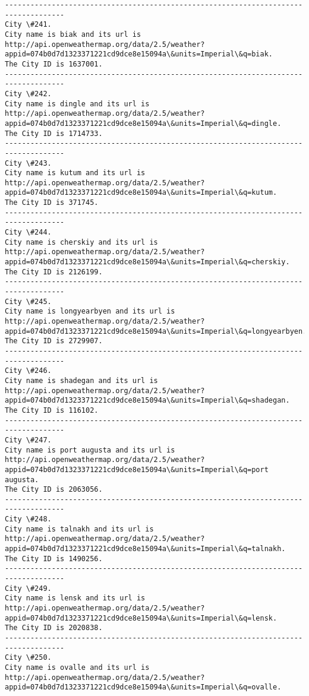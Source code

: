 \documentclass[11pt]{article}
\begin{document}
\begin{Verbatim}[commandchars=\\\{\}]
------------------------------------------------------------------------------------
City \#241.
City name is biak and its url is http://api.openweathermap.org/data/2.5/weather?appid=074b0d7d1323371221cd9dce8e15094a\&units=Imperial\&q=biak.
The City ID is 1637001.
------------------------------------------------------------------------------------
City \#242.
City name is dingle and its url is http://api.openweathermap.org/data/2.5/weather?appid=074b0d7d1323371221cd9dce8e15094a\&units=Imperial\&q=dingle.
The City ID is 1714733.
------------------------------------------------------------------------------------
City \#243.
City name is kutum and its url is http://api.openweathermap.org/data/2.5/weather?appid=074b0d7d1323371221cd9dce8e15094a\&units=Imperial\&q=kutum.
The City ID is 371745.
------------------------------------------------------------------------------------
City \#244.
City name is cherskiy and its url is http://api.openweathermap.org/data/2.5/weather?appid=074b0d7d1323371221cd9dce8e15094a\&units=Imperial\&q=cherskiy.
The City ID is 2126199.
------------------------------------------------------------------------------------
City \#245.
City name is longyearbyen and its url is http://api.openweathermap.org/data/2.5/weather?appid=074b0d7d1323371221cd9dce8e15094a\&units=Imperial\&q=longyearbyen.
The City ID is 2729907.
------------------------------------------------------------------------------------
City \#246.
City name is shadegan and its url is http://api.openweathermap.org/data/2.5/weather?appid=074b0d7d1323371221cd9dce8e15094a\&units=Imperial\&q=shadegan.
The City ID is 116102.
------------------------------------------------------------------------------------
City \#247.
City name is port augusta and its url is http://api.openweathermap.org/data/2.5/weather?appid=074b0d7d1323371221cd9dce8e15094a\&units=Imperial\&q=port augusta.
The City ID is 2063056.
------------------------------------------------------------------------------------
City \#248.
City name is talnakh and its url is http://api.openweathermap.org/data/2.5/weather?appid=074b0d7d1323371221cd9dce8e15094a\&units=Imperial\&q=talnakh.
The City ID is 1490256.
------------------------------------------------------------------------------------
City \#249.
City name is lensk and its url is http://api.openweathermap.org/data/2.5/weather?appid=074b0d7d1323371221cd9dce8e15094a\&units=Imperial\&q=lensk.
The City ID is 2020838.
------------------------------------------------------------------------------------
City \#250.
City name is ovalle and its url is http://api.openweathermap.org/data/2.5/weather?appid=074b0d7d1323371221cd9dce8e15094a\&units=Imperial\&q=ovalle.

\end{Verbatim}
\end{document}
